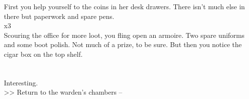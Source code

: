 First you help yourself to the coins in her desk drawers. There isn’t much else in there but paperwork and spare pens.\\
 x3\\

Scouring the office for more loot, you fling open an armoire. Two spare uniforms and some boot polish. Not much of a prize, to be sure. But then you notice the cigar box on the top shelf.\\
\\
\\

Interesting.\\

>> Return to the warden’s chambers -- 